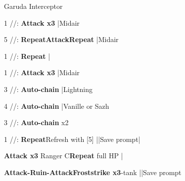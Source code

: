 \begin{fight}{Garuda Interceptor}
	\item [1] \com/\rav/\rav: \textbf{Attack x3} |Midair
	\item [5] \com/\rav/\rav: \textbf{Repeat}\to \textbf{Attack}\to \textbf{Repeat} |Midair
	\item [1] \com/\rav/\rav: \textbf{Repeat} |
	\item [1] \com/\rav/\rav: \textbf{Attack x3} |Midair
	\item [3] \rav/\rav/\rav: \textbf{Auto-chain} |Lightning
	\item [4] \rav/\rav/\rav: \textbf{Auto-chain} |Vanille or Sazh
	\item [3] \rav/\rav/\rav: \textbf{Auto-chain} x2
	\item [1] \com/\rav/\rav: \textbf{Repeat}\to Refresh with [5] |\skip|Save prompt|\skip
\end{fight}
\begin{mainlist}
	\item {} \textbf{Attack x3} Ranger C\to \textbf{Repeat} full HP |\skip
	\item {} \textbf{Attack-Ruin-Attack}\to\textbf{Froststrike x3}\to\sen-tank ||Save prompt
\end{mainlist}
